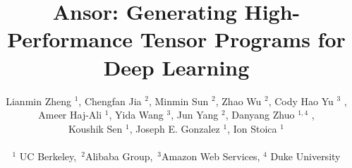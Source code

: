 \documentclass[letterpaper,twocolumn,10pt]{article}
\newcommand{\Ansor}{Ansor\xspace}
\begin{document}
\date{}

\title{ \Ansor: Generating High-Performance Tensor Programs for Deep Learning}


\author{
\rm{Lianmin Zheng $ ^1$,
  Chengfan Jia $ ^2$,
  Minmin Sun $ ^2$,
 Zhao Wu $ ^2$,
Cody Hao Yu $ ^3$} ,\\
\rm{   Ameer Haj-Ali $ ^1$,
  Yida Wang $ ^3$,
  Jun Yang $ ^2$,
  Danyang Zhuo $ ^{1,4}$ }, \\
\rm{Koushik Sen $ ^1$,
	  Joseph E. Gonzalez $ ^1$,
  Ion Stoica $ ^1$}\\
\\
  {$ ^1$ UC Berkeley,\ $ ^2$Alibaba Group,\ $ ^3$Amazon Web Services, $ ^4$ Duke University}
} %

\maketitle















\appendix

\end{document}
